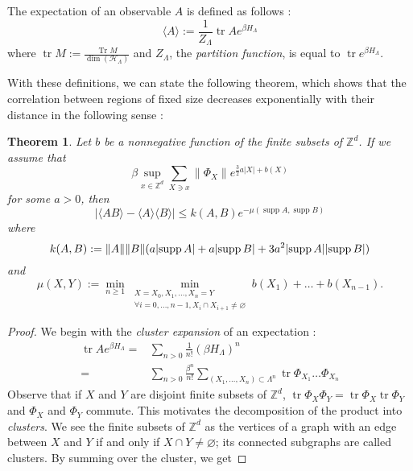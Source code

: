 \documentclass[french]{article}
\DeclarePairedDelimiter\abs{\lvert}{\rvert}
\newtheorem{thm}{Theorem}
\DeclareMathOperator{\Tr}{Tr}
\DeclareMathOperator{\tr}{tr}
\DeclareMathOperator{\supp}{supp}
\begin{document}
 The expectation of an observable $A$ is defined as follows :
 $$
 \langle A \rangle := \frac{1}{Z_\Lambda}\tr Ae^{\beta H_\Lambda}
 $$
 where $\tr M:=\frac{\Tr M}{\dim(\mathcal H_\Lambda)}$ and $Z_\Lambda$, the {\it partition function}, is equal to $\tr e^{\beta H_\Lambda}$.
 
 With these definitions, we can state the following theorem, which shows that the correlation between regions of fixed size decreases exponentially with their distance in the following sense :
 \begin{thm}
     Let $b$ be a nonnegative function of the finite subsets of $\mathbb Z^d$.
     If we assume that 
     $$\beta\sup_{x\in\mathbb Z^d}\sum_{X\ni x}\lVert\Phi_X\rVert e^{\frac{3}{2}a|X|+b(X)}$$ 
     for some $a>0$, then 
     $$|\langle AB\rangle - \langle A\rangle\langle B\rangle|\leq k(A,B)e^{-\mu(\supp A,\supp B)}$$
     where $$k(A,B):=\lVert A\rVert\lVert B\rVert(a\abs{\supp A}+a\abs{\supp B} + 3a^2\abs{\supp A}\abs{\supp B})$$ and 
     $$
     \mu(X,Y):= \min_{n\geq 1} \min_{\substack{X=X_0,X_1,\ldots,X_n=Y \\ \forall i=0,\ldots,n-1, X_i\cap X_{i+1}\neq \varnothing}} b(X_1)+\ldots+b(X_{n-1}).
     $$
 \end{thm}
 \begin{proof}
     We begin with the {\it cluster expansion} of an expectation :
     \begin{align*}
         \tr Ae^{\beta H_\Lambda}=&\sum_{n>0}\frac{1}{n!}(\beta H_\Lambda)^n\\
         =&\sum_{n>0}\frac{\beta^n}{n!}\sum_{(X_1,\ldots, X_n)\subset \Lambda^n}\tr\Phi_{X_1}\ldots\Phi_{X_n}
     \end{align*}
     Observe that if $X$ and $Y$ are disjoint finite subsets of $\mathbb Z^d$, $\tr \Phi_X\Phi_Y=\tr \Phi_X \tr\Phi_Y$ and $\Phi_X$ and $\Phi_Y$ commute.
    This motivates the decomposition of the product into {\it clusters}.
    We see the finite subsets of $\mathbb Z^d$ as the vertices of a graph with an edge between $X$ and $Y$ if and only if $X\cap Y\neq \varnothing$; its connected subgraphs are called clusters.
    By summing over the cluster, we get 
 \end{proof}
 
 
 
 \printbibliography
\end{document}
